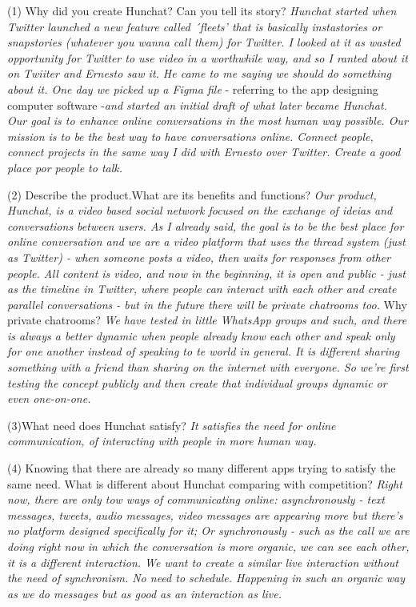 \documentclass[12pt]{article}
\begin{document}
(1) Why did you create Hunchat? Can you tell its story? \textit{Hunchat started when Twitter launched a new feature called ´fleets' that is basically instastories or snapstories (whatever you wanna call them) for Twitter. I looked at it as wasted opportunity for Twitter to use video in a worthwhile way, and so I ranted about it on Twiiter and Ernesto saw it. He came to me saying we should do something about it. One day we picked up a Figma file} - referring to the app designing computer software -\textit{and started an initial draft of what later became Hunchat. Our goal is to enhance online conversations in the most human way possible. Our mission is to be the best way to have conversations online. Connect people, connect projects in the same way I did with Ernesto over Twitter. Create a good place por people to talk.} 

(2) Describe the product.What are its benefits and functions? \textit{Our product, Hunchat, is a video based social network focused on the exchange of ideias and conversations between users. As I already said, the goal is to be the best place for online conversation and we are a video platform that uses the thread system (just as Twitter) - when someone posts a video, then waits for responses from other people. All content is video, and now in the beginning, it is open and public - just as the timeline in Twitter, where people can interact with each other and create parallel conversations - but in the future there will be private chatrooms too.} Why private chatrooms? \textit{We have tested in little WhatsApp groups and such, and there is always a better dynamic when people already know each other and speak only for one another instead of speaking to te world in general. It is different sharing something with a friend than sharing on the internet with everyone. So we're first testing the concept publicly and then create that individual groups dynamic or even one-on-one.}

(3)What need does Hunchat satisfy? \textit{It satisfies the need for online communication, of interacting with people in more human way.}

(4) Knowing that there are already so many different apps trying to satisfy the same need. What is different about Hunchat comparing with competition?  \textit{Right now, there are only tow ways of communicating online: asynchronously - text messages, tweets, audio messages, video messages are appearing more but there's no platform designed specifically for it; Or synchronously - such as the call we are doing right now in which the conversation is more organic, we can see each other, it is a different interaction. We want to create a similar live interaction without the need of synchronism. No need to schedule. Happening in such an organic way as we do messages but as good as an interaction as live. } 
\end{document}
